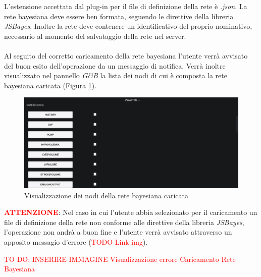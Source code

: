 L'estensione accettata dal plug-in per il file di definizione della rete è \textit{.json}. La rete bayesiana deve essere ben formata, seguendo le direttive della libreria \textit{JSBayes}. Inoltre la rete deve contenere un identificativo del proprio nominativo, necessario al momento del salvataggio della rete nel server.\\
~\\
Al seguito del corretto caricamento della rete bayesiana l'utente verrà avvisato del buon esito dell'operazione da un messaggio di notifica. Verrà inoltre visualizzato nel pannello \textit{G\&B} la lista dei nodi di cui è composta la rete bayesiana caricata (Figura \ref{NodiRete}).

\begin{figure}[H]
	\begin{center}
		\includegraphics[scale=0.35]{./images/NodiRete.png}
		 \caption{Visualizzazione dei nodi della rete bayesiana caricata}	
		 \label{NodiRete}
	\end{center}
\end{figure}

\textbf{\textcolor{red}{ATTENZIONE}}: Nel caso in cui l'utente abbia selezionato per il caricamento un file di definizione della rete non conforme alle direttive della libreria \textit{JSBayes}, l'operazione non andrà a buon fine e l'utente verrà avvisato attraverso un apposito messagio d'errore (\textcolor{red}{TODO Link img}).

\textcolor{red}{TO DO: INSERIRE IMMAGINE Visualizzazione errore Caricamento Rete Bayesiana} 

